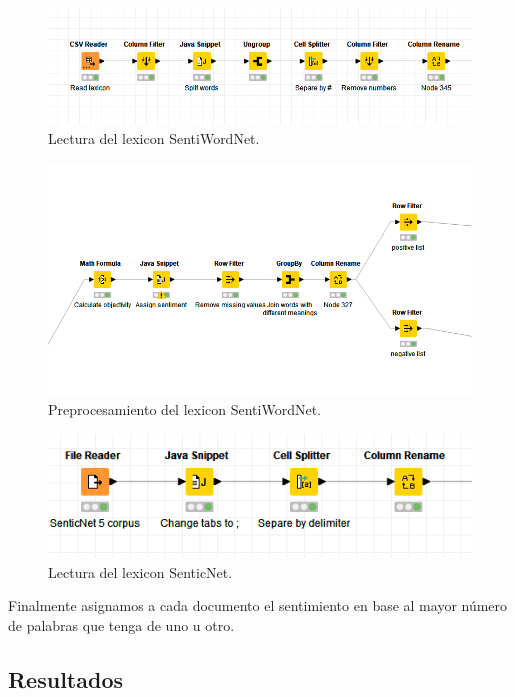 \begin{figure}[H]
    \center\includegraphics[width=.95\linewidth]{img/analysis/sentiword-reading.png}
    \caption{Lectura del lexicon SentiWordNet.}
\end{figure}

\begin{figure}[H]
    \center\includegraphics[width=.95\linewidth]{img/analysis/sentiword-prepro.png}
    \caption{Preprocesamiento del lexicon SentiWordNet.}
\end{figure}

\begin{figure}[H]
    \center\includegraphics[width=.95\linewidth]{img/analysis/senticnet-reading.png}
    \caption{Lectura del lexicon SenticNet.}
\end{figure}

Finalmente asignamos a cada documento el sentimiento en base al mayor número de palabras que tenga de uno u otro.


\subsection{Resultados}

